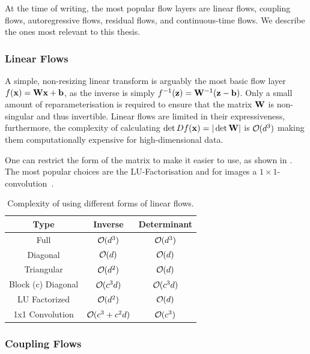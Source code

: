 At the time of writing, the most popular flow layers are linear flows, coupling flows, autoregressive flows, residual flows, and continuous-time flows.
We describe the ones most relevant to this thesis.

\subsubsection{Linear Flows}

A simple, non-resizing linear transform is arguably the most basic flow layer $f(\mathbf{x}) = \mathbf{W}\mathbf{x} + \mathbf{b}$, as the inverse is simply $f^{-1}(\mathbf{z}) = \mathbf{W}^{-1}(\mathbf{z} - \mathbf{b})$.
Only a small amount of reparameterisation is required to ensure that the matrix $\mathbf{W}$ is non-singular and thus invertible.
Linear flows are limited in their expressiveness, furthermore, the complexity of calculating $\det D f(\mathbf{x}) = |\det \mathbf{W}|$ is $\bigO(d^3)$ making them computationally expensive for high-dimensional data.

One can restrict the form of the matrix to make it easier to use, as shown in .
The most popular choices are the LU-Factorisation and for images a $1\times1$-convolution~\cite{GlowGenerativeFlow}.

\begin{table}[h!]
    \centering
    \caption{Complexity of using different forms of linear flows.}
    \label{tab:linear_flows}
    \begin{tabular}{ccc}
    \toprule
    \textbf{Type} & \textbf{Inverse} & \textbf{Determinant} \\
    \midrule
    Full & $\bigO(d^3)$ & $\bigO(d^3)$ \\
    Diagonal & $\bigO(d)$ & $\bigO(d)$ \\
    Triangular & $\bigO(d^2)$ & $\bigO(d)$ \\
    Block (c) Diagonal & $\bigO(c^3d)$ & $\bigO(c^3d)$ \\
    LU Factorized & $\bigO(d^2)$ & $\bigO(d)$ \\
    1x1 Convolution & $\bigO(c^3 + c^2d)$ & $\bigO(c^3)$ \\
    \bottomrule
    \end{tabular}
\end{table}

\subsubsection{Coupling Flows}

